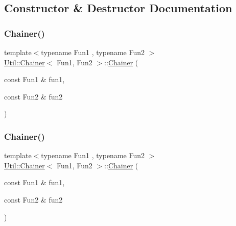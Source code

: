 \subsection{Constructor \& Destructor Documentation}
\mbox{\label{classUtil_1_1Chainer_a326196e6b1b7c50ca66c8930d2274007}} 
\subsubsection{\texorpdfstring{Chainer()}{Chainer()}\hspace{0.1cm}{\footnotesize\ttfamily [1/2]}}
{\footnotesize\ttfamily template$<$typename Fun1 , typename Fun2 $>$ \\
\mbox{\hyperlink{classUtil_1_1Chainer}{Util\+::\+Chainer}}$<$ Fun1, Fun2 $>$\+::\mbox{\hyperlink{classUtil_1_1Chainer}{Chainer}} (\begin{DoxyParamCaption}\item[{const Fun1 \&}]{fun1,  }\item[{const Fun2 \&}]{fun2 }\end{DoxyParamCaption})\hspace{0.3cm}{\ttfamily [inline]}}

\mbox{\label{classUtil_1_1Chainer_a326196e6b1b7c50ca66c8930d2274007}} 
\subsubsection{\texorpdfstring{Chainer()}{Chainer()}\hspace{0.1cm}{\footnotesize\ttfamily [2/2]}}
{\footnotesize\ttfamily template$<$typename Fun1 , typename Fun2 $>$ \\
\mbox{\hyperlink{classUtil_1_1Chainer}{Util\+::\+Chainer}}$<$ Fun1, Fun2 $>$\+::\mbox{\hyperlink{classUtil_1_1Chainer}{Chainer}} (\begin{DoxyParamCaption}\item[{const Fun1 \&}]{fun1,  }\item[{const Fun2 \&}]{fun2 }\end{DoxyParamCaption})\hspace{0.3cm}{\ttfamily [inline]}}




